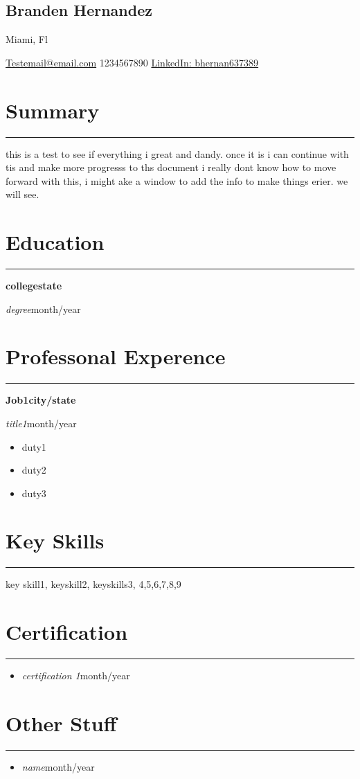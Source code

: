 \documentclass[11pt]{article}%
\newcommand{\resumesection}[1]{\vspace{-0.5cm}\section*{\color{highlight}#1}\vspace{-0.2cm}\hrule\vspace{0.2cm}}%
\newcommand{\location}[1]{\begin{center}\vspace{-0.1cm}#1\vspace{-0.3cm}\end{center}}%
\newcommand{\name}[1]{\begin{center}\section*{\LARGE \color{highlight}#1}\vspace{-0.8cm}\end{center}}%
\begin{document}
%
\normalsize%
\name{Branden Hernandez}%
\location{Miami, Fl}%
\begin{center}%
\href{mailto:email@domain}{Testemail@email.com}%
\vspace*{0.1cm}%
1234567890%
\vspace*{0.1cm}%
\href{https://www.linkedin.com/in/bhernan637389}{LinkedIn: bhernan637389}%
\end{center}%
\resumesection{Summary}%
this is a test to see if everything i great and dandy. once it is i can             continue with tis and make more progresss to ths document            i really dont know how to move forward with this, i might  ake a window to add the info to make            things erier. we will see.%
\resumesection{Education}%
\textbf{college}{\textbf{\hfill {state}}}%
\par%
\textit{degree}{\hfill {month/year}}%
\par%
\resumesection{Professonal Experence}%
\textbf{Job1}{\textbf{\hfill{city/state}}}%
\par%
\textit{title1}{\hfill{month/year}}%
\begin{itemize}%
\item%
duty1%
\item%
duty2%
\item%
duty3%
\end{itemize}%
\resumesection{Key Skills}%
key skill1, keyskill2, keyskills3, 4,5,6,7,8,9%
\resumesection{Certification}%
\begin{itemize}%
\item%
\textit{certification 1}{\hfill{month/year}}%
\end{itemize}%
\resumesection{Other Stuff}%
\begin{itemize}%
\item%
\textit{name}{\hfill{month/year}}%
\end{itemize}%
\end{document}
